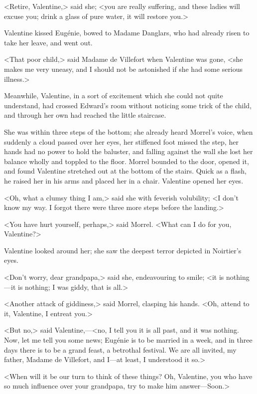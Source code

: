  <Retire, Valentine,> said she; <you are really suffering, and these ladies will excuse you; drink a glass of pure water, it will restore you.> 

 Valentine kissed Eugénie, bowed to Madame Danglars, who had already risen to take her leave, and went out. 

 <That poor child,> said Madame de Villefort when Valentine was gone, <she makes me very uneasy, and I should not be astonished if she had some serious illness.> 

 Meanwhile, Valentine, in a sort of excitement which she could not quite understand, had crossed Edward's room without noticing some trick of the child, and through her own had reached the little staircase. 

 She was within three steps of the bottom; she already heard Morrel's voice, when suddenly a cloud passed over her eyes, her stiffened foot missed the step, her hands had no power to hold the baluster, and falling against the wall she lost her balance wholly and toppled to the floor. Morrel bounded to the door, opened it, and found Valentine stretched out at the bottom of the stairs. Quick as a flash, he raised her in his arms and placed her in a chair. Valentine opened her eyes. 

 <Oh, what a clumsy thing I am,> said she with feverish volubility; <I don't know my way. I forgot there were three more steps before the landing.> 

 <You have hurt yourself, perhaps,> said Morrel. <What can I do for you, Valentine?> 

 Valentine looked around her; she saw the deepest terror depicted in Noirtier's eyes. 

 <Don't worry, dear grandpapa,> said she, endeavouring to smile; <it is nothing—it is nothing; I was giddy, that is all.> 

 <Another attack of giddiness,> said Morrel, clasping his hands. <Oh, attend to it, Valentine, I entreat you.> 

 <But no,> said Valentine,—<no, I tell you it is all past, and it was nothing. Now, let me tell you some news; Eugénie is to be married in a week, and in three days there is to be a grand feast, a betrothal festival. We are all invited, my father, Madame de Villefort, and I—at least, I understood it so.> 

 <When will it be our turn to think of these things? Oh, Valentine, you who have so much influence over your grandpapa, try to make him answer—Soon.> 

